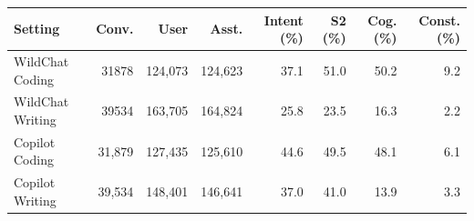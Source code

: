 

\centering
\begin{tabularx}{\textwidth}{>{\raggedright\arraybackslash}Xrrrrrrr}
\toprule
Setting & Conv. & User & Asst. & Intent (\%) & S2 (\%) & Cog. (\%) & Const. (\%) \\
\midrule
WildChat Coding  & 31878 & 124,073  & 124,623  & 37.1 & 51.0 & 50.2 & 9.2 \\
WildChat Writing & 39534 & 163,705  & 164,824  & 25.8 & 23.5 & 16.3  & 2.2 \\
Copilot Coding   & 31,879 & 127,435 & 125,610 & 44.6 & 49.5 & 48.1 & 6.1 \\
Copilot Writing  & 39,534 & 148,401 & 146,641 & 37.0 & 41.0 & 13.9 & 3.3 \\
\bottomrule
\end{tabularx}